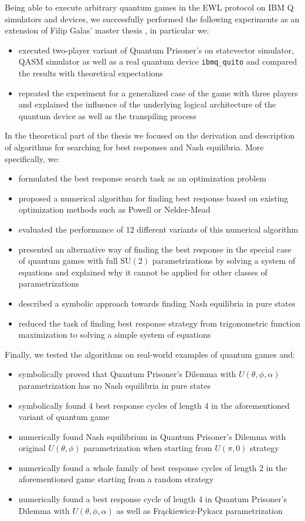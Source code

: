 \documentclass[../main.tex]{subfiles}
\begin{document}
Being able to execute arbitrary quantum games in the EWL protocol on IBM Q simulators and devices, we successfully performed the following experiments as an extension of Filip Galas' master thesis \cite{galas2019quantum}, in particular we:
\begin{itemize}
    \item executed two-player variant of Quantum Prisoner's on statevector simulator, QASM simulator as well as a real quantum device \texttt{ibmq\_quito} and compared the results with theoretical expectations
    \item repeated the experiment for a generalized case of the game with three players and explained the influence of the underlying logical architecture of the quantum device as well as the transpiling process
\end{itemize}
In the theoretical part of the thesis we focused on the derivation and description of algorithms for searching for best responses and Nash equilibria. More specifically, we:
\begin{itemize}
    \item formulated the best response search task as an optimization problem
    \item proposed a numerical algorithm for finding best response based on existing optimization methods such as Powell or Nelder-Mead
    \item evaluated the performance of 12 different variants of this numerical algorithm
    \item presented an alternative way of finding the best response in the special case of quantum games with full $\text{SU}(2)$ parametrizations by solving a system of equations and explained why it cannot be applied for other classes of parametrizations
    \item described a symbolic approach towards finding Nash equilibria in pure states
    \item reduced the task of finding best response strategy from trigonometric function maximization to solving a simple system of equations
\end{itemize}

Finally, we tested the algorithms on real-world examples of quantum games and:
\begin{itemize}
    \item symbolically proved that Quantum Prisoner's Dilemma with $U(\theta, \phi, \alpha)$ parametrization has no Nash equilibria in pure states
    \item symbolically found 4 best response cycles of length 4 in the aforementioned variant of quantum game
    \item numerically found Nash equilibrium in Quantum Prisoner's Dilemma with original $U(\theta, \phi)$ parametrization when starting from $U(\pi, 0)$ strategy
    \item numerically found a whole family of best response cycles of length 2 in the aforementioned game starting from a random strategy
    \item numerically found a best response cycle of length 4 in Quantum Prisoner's Dilemma with $U(\theta, \phi, \alpha)$ as well as Frąckiewicz-Pykacz parametrization
\end{itemize}
\end{document}
